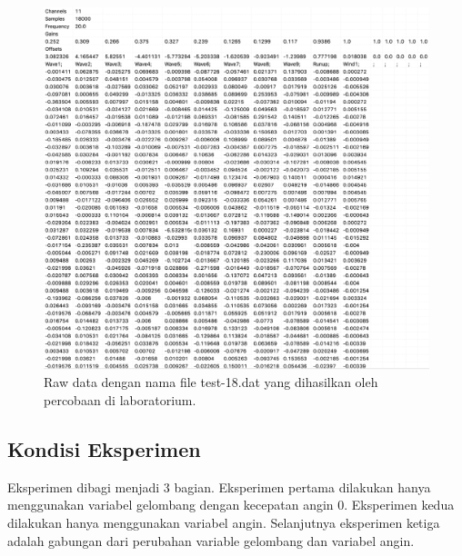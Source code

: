 \begin{figure}[h]
  \begin{center}
    \includegraphics[scale=0.3]{./images/raw_data_test-18.png}
  \end{center}
  \caption{Raw data dengan nama file test-18.dat yang dihasilkan oleh percobaan di laboratorium.}
  \label{fig:raw_data_18}
\end{figure}
\FloatBarrier

\subsection{Kondisi Eksperimen}
\label{kondisiEksperimen}

Eksperimen dibagi menjadi 3 bagian. Eksperimen pertama dilakukan hanya menggunakan variabel gelombang dengan kecepatan angin 0. Eksperimen kedua dilakukan hanya menggunakan variabel angin. Selanjutnya eksperimen ketiga adalah gabungan dari perubahan variable gelombang dan variabel angin.

